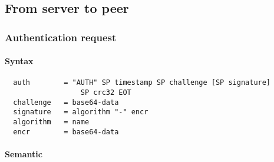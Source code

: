 \documentclass{medusabook}
\begin{document}
\subsection{From server to peer}
\label{sub:1.3.1;medusa_book}

\subsubsection{Authentication request}
\label{subsub:1.3.1.2;medusa_book}

\paragraph{Syntax}
\begin{verbatim}
  auth        = "AUTH" SP timestamp SP challenge [SP signature] 
                  SP crc32 EOT
  challenge   = base64-data
  signature   = algorithm "-" encr
  algorithm   = name
  encr        = base64-data
\end{verbatim}

\paragraph{Semantic}
\end{document}
